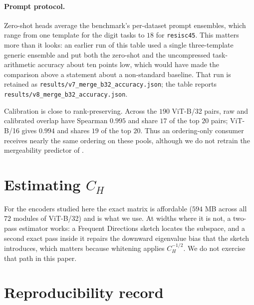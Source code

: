 \paragraph{Prompt protocol.} Zero-shot heads average the benchmark's per-dataset prompt ensembles,
which range from one template for the digit tasks to $18$ for \texttt{resisc45}. This matters more
than it looks: an earlier run of this table used a single three-template generic ensemble and put
both the zero-shot and the uncompressed task-arithmetic accuracy about ten points low, which would
have made the comparison above a statement about a non-standard baseline. That run is retained as
\texttt{results/v7\_merge\_b32\_accuracy.json}; the table reports
\texttt{results/v8\_merge\_b32\_accuracy.json}.

Calibration is close to rank-preserving. Across the $190$ ViT-B/32 pairs, raw and calibrated
overlap have Spearman $0.995$ and share $17$ of the top $20$ pairs; ViT-B/16 gives $0.994$ and
shares $19$ of the top $20$. Thus an ordering-only consumer receives nearly the same ordering on these pools,
although we do not retrain the mergeability predictor of \citet{demystify2026}.

\section{Estimating $C_H$}
\label{app:cov}

For the encoders studied here the exact matrix is affordable ($594$ MB across all $72$ modules of
ViT-B/32) and is what we use. At widths where it is not, a two-pass estimator works: a Frequent
Directions sketch locates the subspace, and a second exact pass inside it repairs the downward
eigenvalue bias that the sketch introduces, which matters because whitening applies
$C_H^{-1/2}$. We do not exercise that path in this paper.

\section{Reproducibility record}
\label{app:repro}

